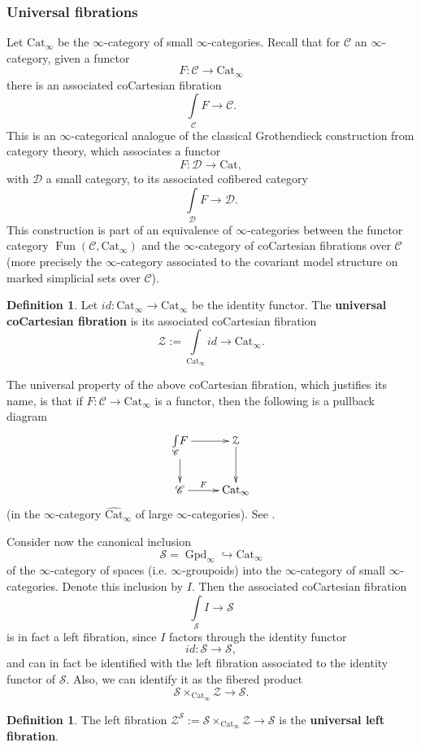 \documentclass[12pt]{amsart}
\theoremstyle{definition}
\newtheorem{definition}[dummy]{Definition}
\newcommand{\cS}{\mathcal{S}}
\newcommand{\cZ}{\mathcal{Z}}
\newcommand{\sC}{\mathscr{C}}
\newcommand{\sD}{\mathscr{D}}
\renewcommand{\i}{\infty}
\def\iGpd{\operatorname{Gpd}_\i}
\def\Fun{\operatorname{Fun}}
\begin{document}
\subsubsection{Universal fibrations}

Let $\mbox{Cat}_\i$ be the $\i$-category of small $\i$-categories. Recall that for $\sC$ an $\i$-category, given a functor $$F:\sC \to \mbox{Cat}_\i$$ there is an associated coCartesian fibration
$$\underset{\sC} \int F \to \sC.$$ This is an $\i$-categorical analogue of the classical Grothendieck construction from category theory, which associates a functor $$F:\sD \to \mbox{Cat},$$ with $\sD$ a small category, to its associated cofibered category $$\underset{\sD} \int F \to \sD.$$ This construction is part of an equivalence of $\i$-categories between the functor category $\Fun\left(\sC,\mbox{Cat}_\i\right)$ and the $\i$-category of coCartesian fibrations over $\sC$ (more precisely the $\i$-category associated to the covariant model structure on marked simplicial sets over $\sC$).

\begin{definition}
Let $id:\mbox{Cat}_\i \to \mbox{Cat}_\i$ be the identity functor. The \textbf{universal coCartesian fibration} is its associated coCartesian fibration
$$\cZ:=\underset{\mbox{Cat}_\i} \int{\!\!\!id}  \to \mbox{Cat}_\i.$$
\end{definition}

The universal property of the above coCartesian fibration, which justifies its name, is that if $F:\sC \to \mbox{Cat}_\i$ is a functor, then the following is a pullback diagram
$$\xymatrix{\underset{\sC} \int F \ar[d] \ar[r] & \cZ \ar[d]\\
\sC \ar[r]^-{F} & \mbox{Cat}_\i}$$
(in the $\i$-category $\widehat{\mbox{Cat}}_\i$ of large $\i$-categories). See \cite[Section 3.3.2]{htt}.

Consider now the canonical inclusion $$\cS=\iGpd \hookrightarrow \mbox{Cat}_\i$$ of the $\i$-category of spaces (i.e. $\i$-groupoids) into the $\i$-category of small $\i$-categories. Denote this inclusion by $I.$ Then the associated coCartesian fibration
$$\underset{\cS} \int I \to \cS$$ is in fact a left fibration, since $I$ factors through the identity functor $$id:\cS \to \cS,$$ and can in fact be identified with the left fibration associated to the identity functor of $\cS.$ Also, we can identify it as the fibered product $$\cS \times_{\mbox{Cat}_{\i}} \cZ \to \cS.$$

\begin{definition}
The left fibration $\cZ^{\cS}:=\cS \times_{\mbox{Cat}_{\i}} \cZ \to \cS$ is the \textbf{universal left fibration}.
\end{definition}
\end{document}
